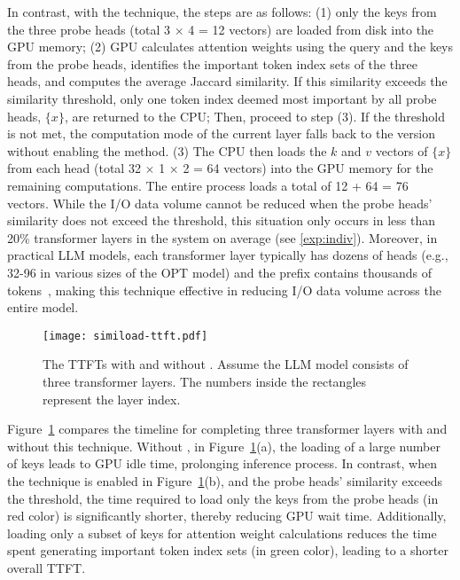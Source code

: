 In contrast, with the \techa{} technique, the steps are as follows:
(1) only the keys from the three probe heads (total 3 $\times$ 4 = 12 vectors)
are loaded from disk into the GPU memory; 
(2) GPU calculates attention weights using the query and the keys from the probe heads, 
identifies the important token index sets of the three heads, 
and computes the average Jaccard similarity. 
If this similarity exceeds the similarity threshold, only one token index 
deemed most important by all probe heads, $\{x\}$, are returned to the CPU; Then, proceed to step (3).
If the threshold is not met, the computation mode of the current layer falls back to the version without enabling the \techa{} method.
(3) The CPU then loads the \(k\) and \(v\) vectors of $\{x\}$ from each head
(total 32 $\times$ 1 $\times$ 2 = 64 vectors) into the GPU  memory for the remaining
computations. The entire process loads a total of 12 + 64 = 76 vectors.
While the I/O data volume cannot be reduced when the probe heads' similarity does not exceed the threshold, this situation only occurs in less than 20\% transformer layers in the \pname{} system on average (see \cref{exp:indiv}). Moreover, in practical LLM models, each transformer layer typically has dozens of heads (e.g., 32-96 in various sizes of the OPT model) and the prefix contains thousands of tokens~\cite{chunkattention-arxiv24, cachegen-sigcomm24}, making this technique effective in reducing I/O data volume across the entire model.


\begin{figure}
	\centering
	\texttt{[image: simiload-ttft.pdf]}
	\caption{The TTFTs with and without \techa{}. Assume the LLM model consists of three transformer layers. The numbers inside the rectangles represent the layer index.}
	\label{fig:simiload-ttft}
\end{figure}


Figure~\ref{fig:simiload-ttft} compares the timeline for completing three transformer layers with and without this technique. Without \techa{}, in Figure~\ref{fig:simiload-ttft}(a), the loading of a large number of keys leads to GPU idle time, prolonging inference process. In contrast, when the technique is enabled in Figure~\ref{fig:simiload-ttft}(b), and the probe heads’ similarity exceeds the threshold, the time required to load only the keys from the probe heads (in red color) is significantly shorter, thereby reducing GPU wait time. Additionally, loading only a subset of keys for attention weight calculations reduces the time spent generating important token index sets (in green color), leading to a shorter overall TTFT.

